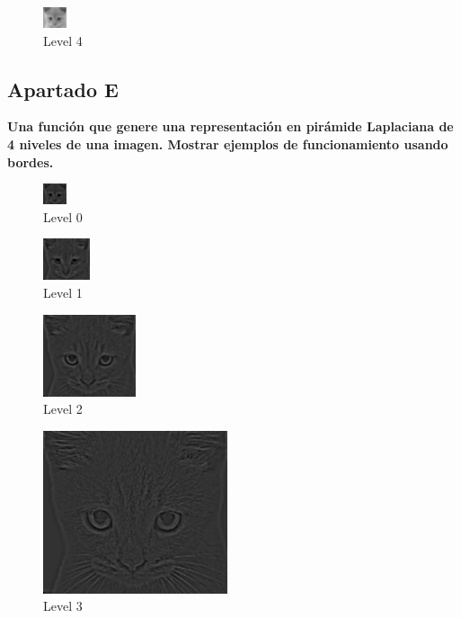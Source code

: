 \documentclass{article}
\begin{document}
\begin{figure}[H]
\centering
\includegraphics[scale=1]{Ejercicio2d/cat4.png}
\caption{Level 4}
\end{figure}



\subsection*{Apartado E}
\textbf{Una función que genere una representación en pirámide Laplaciana de 4 niveles de una imagen. Mostrar ejemplos de funcionamiento usando bordes.}



\begin{figure}[H]
\centering
\includegraphics[scale=1]{Ejercicio2e/cat0.png}
\caption{Level 0}
\end{figure}

\begin{figure}[H]
\centering
\includegraphics[scale=1]{Ejercicio2e/cat1.png}
\caption{Level 1}
\end{figure}

\begin{figure}[H]
\centering
\includegraphics[scale=1]{Ejercicio2e/cat2.png}
\caption{Level 2}
\end{figure}

\begin{figure}[H]
\centering
\includegraphics[scale=1]{Ejercicio2e/cat3.png}
\caption{Level 3}
\end{figure}
\end{document}
